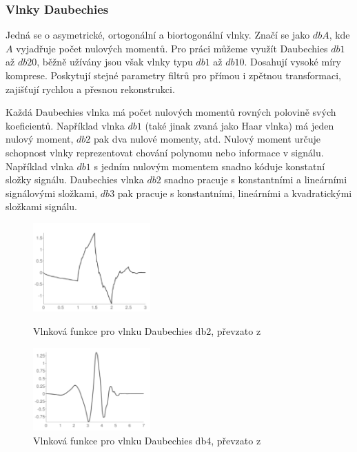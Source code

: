 \subsubsection{Vlnky Daubechies}

Jedná se o asymetrické, ortogonální a biortogonální vlnky. Značí se jako $dbA$, kde $A$ vyjadřuje počet nulových momentů. Pro práci můžeme využít Daubechies $db1$ až $db20$, běžně užívány jsou však vlnky typu $db1$ až $db10$. \cite{PyWaveletsBrowser} Dosahují vysoké míry komprese. Poskytují stejné parametry filtrů pro přímou i zpětnou transformaci, zajišťují rychlou a přesnou rekonstrukci. \cite{WaveletHlavac} 
    
Každá Daubechies vlnka má počet nulových momentů rovných polovině svých koeficientů. Například vlnka $db1$ (také jinak zvaná jako Haar vlnka) má jeden nulový moment, $db2$ pak dva nulové momenty, atd. Nulový moment určuje schopnost vlnky reprezentovat chování polynomu nebo informace v signálu. Například vlnka $db1$ s jedním nulovým momentem snadno kóduje konstatní složky signálu. Daubechies vlnka $db2$ snadno pracuje s konstantními a lineárními signálovými složkami, $db3$ pak pracuje s konstantními, lineárními a kvadratickými složkami signálu. \cite{WaveletsSignalImageProcessing}

\begin{figure}[!htbp]
  \begin{minipage}[b]{0.5\linewidth}
    \centering
    \includegraphics[width=170px]{obrazky-figures/db2wavelet.PNG}
    \caption{Vlnková funkce pro vlnku Daubechies db2, převzato z \cite{PyWaveletsBrowser}}
  \end{minipage}
  \hspace{0.5cm}
  \begin{minipage}[b]{0.5\linewidth}
    \centering
    \includegraphics[width=170px]{obrazky-figures/db4wavelet.PNG}
    \caption{Vlnková funkce pro vlnku Daubechies db4, převzato z \cite{PyWaveletsBrowser}}
  \end{minipage}
\end{figure}
    
